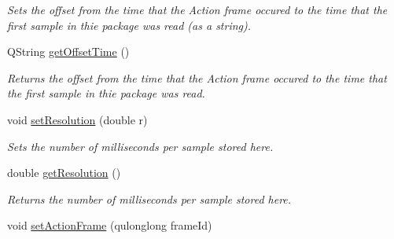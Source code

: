 \begin{DoxyCompactItemize}
\begin{DoxyCompactList}\small\item\em Sets the offset from the time that the Action frame occured to the time that the first sample in thie package was read (as a string). \end{DoxyCompactList}\item 
\hypertarget{class_picto_1_1_behavioral_data_unit_package_ac335624a6faec29d61997ee72970d948}{Q\-String \hyperlink{class_picto_1_1_behavioral_data_unit_package_ac335624a6faec29d61997ee72970d948}{get\-Offset\-Time} ()}\label{class_picto_1_1_behavioral_data_unit_package_ac335624a6faec29d61997ee72970d948}

\begin{DoxyCompactList}\small\item\em Returns the offset from the time that the Action frame occured to the time that the first sample in thie package was read. \end{DoxyCompactList}\item 
\hypertarget{class_picto_1_1_behavioral_data_unit_package_a239051443324d1a4afeb4625a2ba4459}{void \hyperlink{class_picto_1_1_behavioral_data_unit_package_a239051443324d1a4afeb4625a2ba4459}{set\-Resolution} (double r)}\label{class_picto_1_1_behavioral_data_unit_package_a239051443324d1a4afeb4625a2ba4459}

\begin{DoxyCompactList}\small\item\em Sets the number of milliseconds per sample stored here. \end{DoxyCompactList}\item 
\hypertarget{class_picto_1_1_behavioral_data_unit_package_ac8d5bf15ce7ae2e0c32a6bd26be1b61f}{double \hyperlink{class_picto_1_1_behavioral_data_unit_package_ac8d5bf15ce7ae2e0c32a6bd26be1b61f}{get\-Resolution} ()}\label{class_picto_1_1_behavioral_data_unit_package_ac8d5bf15ce7ae2e0c32a6bd26be1b61f}

\begin{DoxyCompactList}\small\item\em Returns the number of milliseconds per sample stored here. \end{DoxyCompactList}\item 
\hypertarget{class_picto_1_1_behavioral_data_unit_package_a5147d399351530b0636a52759026237b}{void \hyperlink{class_picto_1_1_behavioral_data_unit_package_a5147d399351530b0636a52759026237b}{set\-Action\-Frame} (qulonglong frame\-Id)}\label{class_picto_1_1_behavioral_data_unit_package_a5147d399351530b0636a52759026237b}


\end{DoxyCompactItemize}
